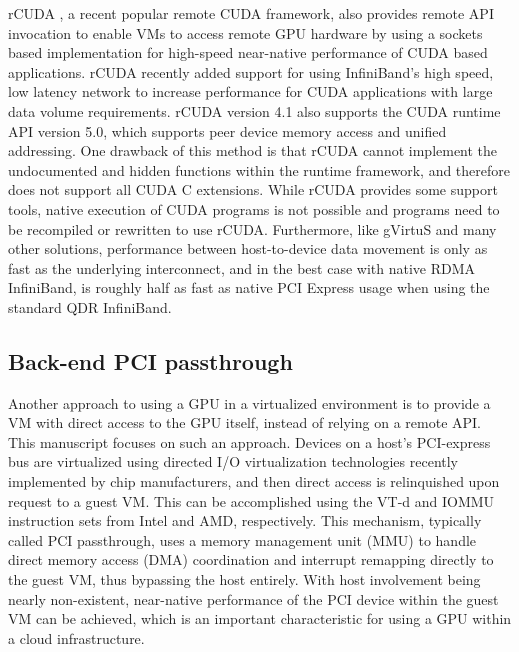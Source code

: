 rCUDA \cite{duato2010rcuda, duato2011enabling}, a recent popular remote CUDA framework, also provides remote API invocation to enable VMs to access remote GPU hardware by using a sockets based implementation for high-speed near-native performance of CUDA based applications. rCUDA recently added support for using InfiniBand's high speed, low latency network to increase performance for CUDA applications with large data volume requirements. rCUDA version 4.1 also supports the CUDA runtime API version 5.0, which supports peer device memory access and unified addressing. One drawback of this method is that rCUDA cannot implement the undocumented and hidden functions within the runtime framework, and therefore does not support all CUDA C extensions.  While rCUDA provides some support tools, native execution of CUDA programs is not possible and programs need to be recompiled or rewritten to use rCUDA. Furthermore, like gVirtuS and many other solutions, performance between host-to-device data movement is only as fast as the underlying interconnect, and in the best case with native RDMA InfiniBand, is roughly half as fast as native PCI Express usage when using the standard QDR InfiniBand.



\begin{comment}
\section{Design and Implementation} 
\end{comment}

\subsection{Back-end PCI passthrough}

Another approach to using a GPU in a virtualized environment is to provide a VM with direct access to the GPU itself, instead of relying on a remote API. This manuscript focuses on such an approach.  Devices on a host's PCI-express bus are virtualized using directed I/O virtualization technologies recently implemented by chip manufacturers, and then direct access is relinquished upon request to a guest VM. This can be accomplished using the VT-d and IOMMU instruction sets from Intel and AMD, respectively. This mechanism, typically called PCI passthrough, uses a memory management unit (MMU) to handle direct memory access (DMA) coordination and interrupt remapping directly to the guest VM, thus bypassing the host entirely.  With host involvement being nearly non-existent, near-native performance of the PCI device within the guest VM can be achieved, which is an important characteristic for using a GPU within a cloud infrastructure.

